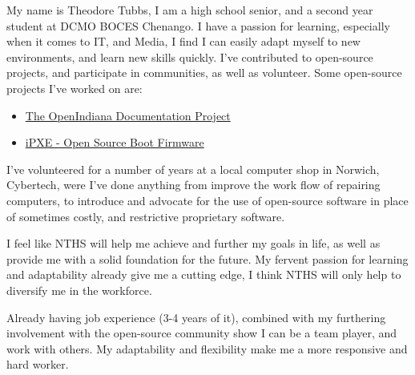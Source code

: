 \documentclass[11pt, a4paper]{awesome-cv} %
\begin{document}
\makecvheader %

\makelettertitle %


\begin{cvletter}


My name is Theodore Tubbs, I am a high school senior, and a second year student
at DCMO BOCES Chenango. I have a passion for learning, especially when it comes
to IT, and Media, I find I can easily adapt myself to new environments, and
learn new skills quickly. I've contributed to open-source projects, and
participate in  communities, as well as volunteer. Some open-source
projects I've worked on are:

	\begin{itemize}
		\item {\href{https://github.com/OpenIndiana/oi-docs}{The OpenIndiana Documentation Project}}
		\item {\href{http://ipxe.org/}{iPXE - Open Source Boot Firmware}}
	\end{itemize}

I've volunteered for a number of years at a local computer shop in Norwich,
Cybertech, were I've done anything from improve the work flow of repairing
computers, to introduce and advocate for the use of open-source software in
place of sometimes costly, and restrictive proprietary software.


I feel like NTHS will help me achieve and further my goals in life, as well as
provide me with a solid foundation for the future. My fervent passion for
learning and adaptability already give me a cutting edge, I think NTHS will
only help to diversify me in the workforce.


Already having job experience (3-4 years of it), combined with my furthering
involvement with the open-source community show I can be a team player, and
work with others. My adaptability and flexibility make me a more responsive
and hard worker.


\end{cvletter}


\makeletterclosing %
\end{document}
